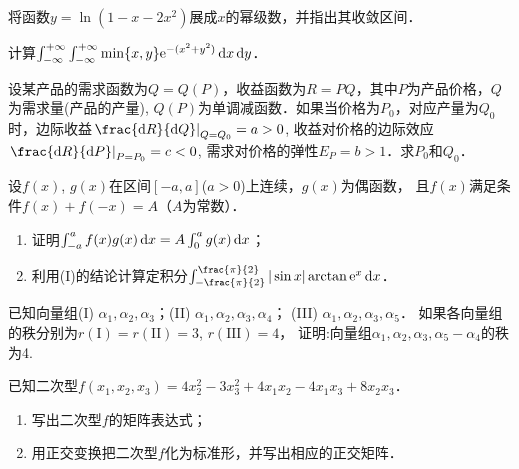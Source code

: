 \documentclass[plain,noanswer,medmath]{../../template/jnuexam}
\begin{document}

\begin{problem}
将函数$y = \ln(1 - x - 2x^2)$展成$x$的幂级数，并指出其收敛区间．
\end{problem}



\begin{problem}
计算$\int_{-\infty}^{+\infty} \int_{-\infty}^{+\infty} \min \{x,y\} \mathrm{e}^{- (x^2 + y^2)} \mathop{}\!\mathrm{d} x\mathop{}\!\mathrm{d} y$．
\end{problem}



\begin{problem}
设某产品的需求函数为$Q = Q(P)$，收益函数为$R = PQ$，其中$P$为产品价格，$Q$为需求量(产品的产量),
$Q(P)$为单调减函数．如果当价格为$P_0$，对应产量为$Q_0$时，边际收益$\left. \frac{\d R}{\d Q} \right|_{Q = Q_0} = a > 0$,
收益对价格的边际效应$\left. \frac{\d R}{\d P} \right|_{P = P_0} = c < 0$,
需求对价格的弹性$E_P = b > 1$．求$P_0$和$Q_0$．
\end{problem}



\begin{problem}
设$f(x)$, $g(x)$在区间$[- a,a]$($a > 0$)上连续，$g(x)$为偶函数，
且$f(x)$满足条件$f(x) + f(- x) = A$（$A$为常数）．
\begin{enumerate}
\item 证明$\int_{- a}^a f(x)g(x)\mathop{}\!\mathrm{d} x = A\int_0^a g(x)\mathop{}\!\mathrm{d} x$；
\item 利用(I)的结论计算定积分$\int_{-\frac{\pi}{2}}^{\frac{\pi}{2}}|\sin x|\arctan\e^x\dx$．
\end{enumerate}
\end{problem}



\begin{problem}
已知向量组(I) $\alpha_1,\alpha_2,\alpha_3$；(II) $\alpha_1,\alpha_2,\alpha_3,\alpha_4$；
(III) $\alpha_1,\alpha_2,\alpha_3,\alpha_5$．
如果各向量组的秩分别为$r(\textrm{I}) = r(\textrm{II}) = 3$, $r(\textrm{III}) = 4$，
证明:向量组$\alpha_1,\alpha_2,\alpha_3,\alpha_5 - \alpha_4$的秩为4.
\end{problem}



\begin{problem}
已知二次型$f(x_1,x_2,x_3) = 4x_2^2- 3x_3^2+ 4x_1x_2 - 4x_1x_3 + 8x_2x_3$．
\begin{enumerate}
\item 写出二次型$f$的矩阵表达式；
\item 用正交变换把二次型$f$化为标准形，并写出相应的正交矩阵．
\end{enumerate}
\end{problem}
\end{document}
